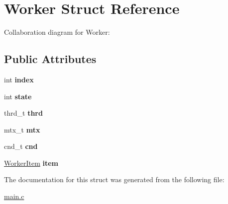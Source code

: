 \hypertarget{structWorker}{}\section{Worker Struct Reference}
\label{structWorker}


Collaboration diagram for Worker\+:
\subsection*{Public Attributes}
\begin{DoxyCompactItemize}
\item 
\mbox{\label{structWorker_a907158fe4322e1a0e2edeb426d85e757}} 
int {\bfseries index}
\item 
\mbox{\label{structWorker_a1003e459fb7686782b33812bc9bbe95c}} 
int {\bfseries state}
\item 
\mbox{\label{structWorker_aadc19b994d770006cb5303fa46a257f8}} 
thrd\+\_\+t {\bfseries thrd}
\item 
\mbox{\label{structWorker_a94f77d872408098dc5ff3d6380161c96}} 
mtx\+\_\+t {\bfseries mtx}
\item 
\mbox{\label{structWorker_a9306d902e2a9177739345af14a3c4301}} 
cnd\+\_\+t {\bfseries cnd}
\item 
\mbox{\label{structWorker_a5543b8205b70f14eaf07a15bd255580a}} 
\hyperlink{structWorkerItem}{Worker\+Item} {\bfseries item}
\end{DoxyCompactItemize}


The documentation for this struct was generated from the following file\+:\begin{DoxyCompactItemize}
\item 
\hyperlink{main_8c}{main.\+c}\end{DoxyCompactItemize}
